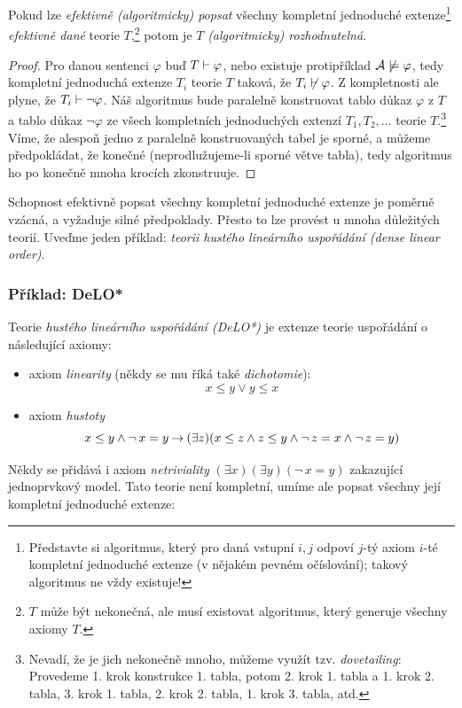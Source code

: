 \begin{proposition}\label{propositon:efficient-complete-simple}    
    Pokud lze \emph{efektivně (algoritmicky) popsat} všechny kompletní jednoduché extenze\footnote{Představte si algoritmus, který pro daná vstupní $i,j$ odpoví $j$-tý axiom $i$-té kompletní jednoduché extenze (v nějakém pevném očíslování); takový algoritmus ne vždy existuje!} \emph{efektivně dané} teorie $T$,\footnote{$T$ může být nekonečná, ale musí existovat algoritmus, který generuje všechny axiomy $T$.} potom je $T$ \emph{(algoritmicky) rozhodnutelná}.
\end{proposition}
\begin{proof}
Pro danou sentenci $\varphi$ buď $T\vdash\varphi$, nebo existuje protipříklad $\mathcal{A}\not\models\varphi$, tedy kompletní jednoduchá extenze $T_i$ teorie $T$ taková, že $T_i\not\vdash\varphi$. Z kompletnosti ale plyne, že $T_i\vdash\neg\varphi$. Náš algoritmus bude paralelně konstruovat tablo důkaz $\varphi$ z $T$ a tablo důkaz $\neg\varphi$ ze všech kompletních jednoduchých extenzí $T_1,T_2,\dots$ teorie $T$.\footnote{Nevadí, že je jich nekonečně mnoho, můžeme využít tzv. \emph{dovetailing}: Provedeme 1. krok konstrukce 1. tabla, potom 2. krok 1. tabla a 1. krok 2. tabla, 3. krok 1. tabla, 2. krok 2. tabla, 1. krok 3. tabla, atd.} Víme, že alespoň jedno z paralelně konstruovaných tabel je sporné, a můžeme předpokládat, že konečné (neprodlužujeme-li sporné větve tabla), tedy algoritmus ho po konečně mnoha krocích zkonstruuje.
\end{proof}

Schopnost efektivně popsat všechny kompletní jednoduché extenze je poměrně vzácná, a vyžaduje silné předpoklady. Přesto to lze provést u mnoha důležitých teorií. Uveďme jeden příklad: \emph{teorii hustého lineárního uspořádání (dense linear order)}.

\subsubsection{Příklad: DeLO*}

Teorie \emph{hustého lineárního uspořádání (DeLO*)}  je extenze teorie uspořádání o následující axiomy: 
\begin{itemize}
    \item axiom \emph{linearity} (někdy se mu říká také \emph{dichotomie}):
    $$
    x\leq y\lor y\leq x
    $$
    \item axiom \emph{hustoty}
    $$
    {x\leq y}\land{\neg\,x=y}\mathbin{\rightarrow}(\exists z)(x\leq z\land z\leq y\land\neg\,z=x\land\neg\,z=y)
    $$
\end{itemize}
Někdy se přidává i axiom \emph{netriviality} $(\exists x)(\exists y)(\neg\,x=y)$ zakazující jednoprvkový model. Tato teorie není kompletní, umíme ale popsat všechny její kompletní jednoduché extenze:

